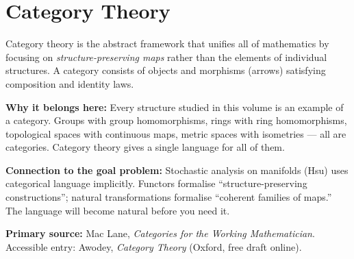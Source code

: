 \chapter{Category Theory}

\vspace{0.5em}

\begin{tcolorbox}[
  colback=blue!4,
  colframe=blue!30,
  arc=2pt,
  left=8pt, right=8pt, top=6pt, bottom=6pt,
  title={\small\textbf{Chapter Overview}},
  fonttitle=\small\bfseries
]
\small
Category theory is the abstract framework that unifies all of mathematics
by focusing on \emph{structure-preserving maps} rather than the elements
of individual structures.
A category consists of objects and morphisms (arrows) satisfying
composition and identity laws.

\medskip
\textbf{Why it belongs here:}
Every structure studied in this volume is an example of a category.
Groups with group homomorphisms, rings with ring homomorphisms,
topological spaces with continuous maps, metric spaces with
isometries --- all are categories.
Category theory gives a single language for all of them.

\medskip
\textbf{Connection to the goal problem:}
Stochastic analysis on manifolds (Hsu) uses categorical language implicitly.
Functors formalise ``structure-preserving constructions'';
natural transformations formalise ``coherent families of maps.''
The language will become natural before you need it.

\medskip
\textbf{Primary source:} Mac Lane, \textit{Categories for the Working Mathematician}.
Accessible entry: Awodey, \textit{Category Theory} (Oxford, free draft online).
\end{tcolorbox}

\vspace{0.5em}

